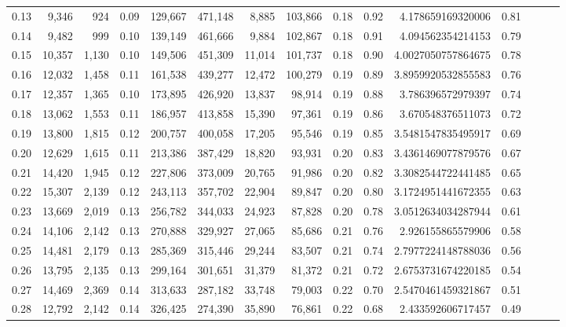\begin{tabular}{rrrrrrrrrrrrrrr}
0.13 &   9,346 &    924 &  0.09 &  129,667 &  471,148 &    8,885 &  103,866 &  0.18 &  0.92 &     4.178659169320006 &      0.81 \\
0.14 &   9,482 &    999 &  0.10 &  139,149 &  461,666 &    9,884 &  102,867 &  0.18 &  0.91 &     4.094562354214153 &      0.79 \\
0.15 &  10,357 &  1,130 &  0.10 &  149,506 &  451,309 &   11,014 &  101,737 &  0.18 &  0.90 &    4.0027050757864675 &      0.78 \\
0.16 &  12,032 &  1,458 &  0.11 &  161,538 &  439,277 &   12,472 &  100,279 &  0.19 &  0.89 &    3.8959920532855583 &      0.76 \\
0.17 &  12,357 &  1,365 &  0.10 &  173,895 &  426,920 &   13,837 &   98,914 &  0.19 &  0.88 &     3.786396572979397 &      0.74 \\
0.18 &  13,062 &  1,553 &  0.11 &  186,957 &  413,858 &   15,390 &   97,361 &  0.19 &  0.86 &     3.670548376511073 &      0.72 \\
0.19 &  13,800 &  1,815 &  0.12 &  200,757 &  400,058 &   17,205 &   95,546 &  0.19 &  0.85 &    3.5481547835495917 &      0.69 \\
0.20 &  12,629 &  1,615 &  0.11 &  213,386 &  387,429 &   18,820 &   93,931 &  0.20 &  0.83 &    3.4361469077879576 &      0.67 \\
0.21 &  14,420 &  1,945 &  0.12 &  227,806 &  373,009 &   20,765 &   91,986 &  0.20 &  0.82 &    3.3082544722441485 &      0.65 \\
0.22 &  15,307 &  2,139 &  0.12 &  243,113 &  357,702 &   22,904 &   89,847 &  0.20 &  0.80 &    3.1724951441672355 &      0.63 \\
0.23 &  13,669 &  2,019 &  0.13 &  256,782 &  344,033 &   24,923 &   87,828 &  0.20 &  0.78 &    3.0512634034287944 &      0.61 \\
0.24 &  14,106 &  2,142 &  0.13 &  270,888 &  329,927 &   27,065 &   85,686 &  0.21 &  0.76 &     2.926155865579906 &      0.58 \\
0.25 &  14,481 &  2,179 &  0.13 &  285,369 &  315,446 &   29,244 &   83,507 &  0.21 &  0.74 &    2.7977224148788036 &      0.56 \\
0.26 &  13,795 &  2,135 &  0.13 &  299,164 &  301,651 &   31,379 &   81,372 &  0.21 &  0.72 &    2.6753731674220185 &      0.54 \\
0.27 &  14,469 &  2,369 &  0.14 &  313,633 &  287,182 &   33,748 &   79,003 &  0.22 &  0.70 &    2.5470461459321867 &      0.51 \\
0.28 &  12,792 &  2,142 &  0.14 &  326,425 &  274,390 &   35,890 &   76,861 &  0.22 &  0.68 &     2.433592606717457 &      0.49 \\

\end{tabular}
